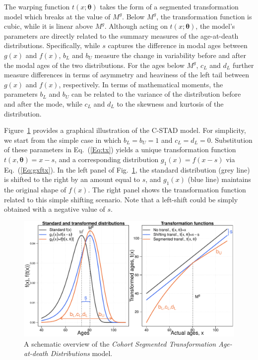 \documentclass[11pt, a4paper]{article}
\begin{document}
The warping function $t(x;\bm{\theta})$ takes the form of a segmented transformation model which breaks at the value of $M^{g}$. Below $M^{g}$, the transformation function is cubic, while it is linear above $M^{g}$. Although acting on $t(x;\bm{\theta})$, the model's parameters are directly related to the summary measures of the age-at-death distributions. Specifically, while $s$ captures the difference in modal ages between $g(x)$ and $f(x)$, $b_L$ and $b_U$ measure the change in variability before and after the modal ages of the two distributions. For the ages below $M^{g}$, $c_L$ and $d_L$ further measure differences in terms of asymmetry and heaviness of the left tail between $g(x)$ and $f(x)$, respectively. In terms of mathematical moments, the parameters $b_L$ and $b_U$ can be related to the variance of the distribution before and after the mode, while $c_L$ and $d_L$ to the skewness and kurtosis of the distribution. \par

Figure~\ref{Fig:CSTADmodel} provides a graphical illustration of the C-STAD model. For simplicity, we start from the simple case in which $b_L = b_U = 1$ and $c_L = d_L = 0$. Substitution of these parameters in Eq.~(\ref{Eq:tx}) yields a unique transformation function $t(x,\bm{\theta})=x-s$, and a corresponding distribution $g_1(x) = f(x-s)$ via Eq.~(\ref{Eq:gxftx}). In the left panel of Fig.~\ref{Fig:CSTADmodel}, the standard distribution (grey line) is shifted to the right by an amount equal to $s$, and $g_1(x)$ (blue line) maintains the original shape of $f(x)$. The right panel shows the transformation function related to this simple shifting scenario. Note that a left-shift could be simply obtained with a negative value of $s$. \par

\begin{figure}[t]
	\begin{center}
		\includegraphics[scale=0.57]{./Figures/F1.pdf} 
		\caption{A schematic overview of the \emph{Cohort Segmented Transformation Age-at-death Distributions} model.\label{Fig:CSTADmodel}}    
	\end{center}
\end{figure}
\end{document}
